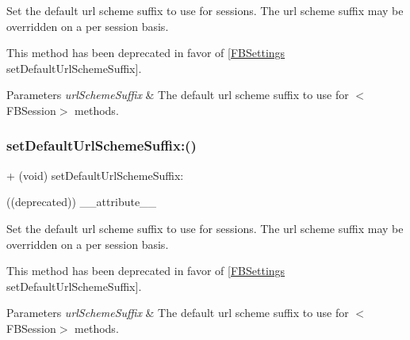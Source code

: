 Set the default url scheme suffix to use for sessions. The url scheme suffix may be overridden on a per session basis.

This method has been deprecated in favor of \mbox{[}\hyperlink{interfaceFBSettings}{F\+B\+Settings} set\+Default\+Url\+Scheme\+Suffix\mbox{]}.


\begin{DoxyParams}{Parameters}
{\em url\+Scheme\+Suffix} & The default url scheme suffix to use for $<$\+F\+B\+Session$>$ methods. \\
\hline
\end{DoxyParams}
\mbox{\label{interfaceFBSession_ac3d4f0df3cae8fe5091b9d98b9f166d4}} 
\subsubsection{\texorpdfstring{set\+Default\+Url\+Scheme\+Suffix\+:()}{setDefaultUrlSchemeSuffix:()}\hspace{0.1cm}{\footnotesize\ttfamily [5/5]}}
{\footnotesize\ttfamily + (void) set\+Default\+Url\+Scheme\+Suffix\+: \begin{DoxyParamCaption}\item[{((deprecated))}]{\+\_\+\+\_\+attribute\+\_\+\+\_\+ }\end{DoxyParamCaption}}

Set the default url scheme suffix to use for sessions. The url scheme suffix may be overridden on a per session basis.

This method has been deprecated in favor of \mbox{[}\hyperlink{interfaceFBSettings}{F\+B\+Settings} set\+Default\+Url\+Scheme\+Suffix\mbox{]}.


\begin{DoxyParams}{Parameters}
{\em url\+Scheme\+Suffix} & The default url scheme suffix to use for $<$\+F\+B\+Session$>$ methods. \\
\hline
\end{DoxyParams}
\mbox{\label{interfaceFBSession_a56e9467165f832f3151dadd14190868b}} 
